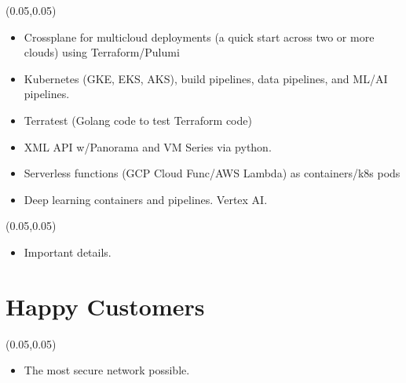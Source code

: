 \documentclass[aspectratio=169]{beamer}
\begin{document}
\begin{frame}{}
    \setlength{\TPHorizModule}{\textwidth}
    \setlength{\TPVertModule}{\textwidth}
    \begin{textblock}{0.74}(0.05,0.05)
        \bfseries\large{}
    \end{textblock}
    \begin{itemize}
        \item Crossplane for multicloud deployments (a quick start across two or more clouds) using Terraform/Pulumi
        \item Kubernetes (GKE, EKS, AKS), build pipelines, data pipelines, and ML/AI pipelines.
        \item Terratest (Golang code to test Terraform code)
        \item XML API w/Panorama and VM Series via python.
        \item Serverless functions (GCP Cloud Func/AWS Lambda) as containers/k8s pods
        \item Deep learning containers and pipelines. Vertex AI.
    \end{itemize} 
\end{frame}

\begin{frame}{}
    \setlength{\TPHorizModule}{\textwidth}
    \setlength{\TPVertModule}{\textwidth}
    \begin{textblock}{0.74}(0.05,0.05)
        \bfseries\large{}
    \end{textblock}
    \begin{itemize}
        \item Important details.
    \end{itemize}
\end{frame}

\section{Happy Customers}

\begin{frame}{}
    \setlength{\TPHorizModule}{\textwidth}
    \setlength{\TPVertModule}{\textwidth}
    \begin{textblock}{0.74}(0.05,0.05)
        \bfseries\large{}
    \end{textblock}
    \begin{itemize} 
        \item The most secure network possible.
    \end{itemize} 
\end{frame}
\end{document}
